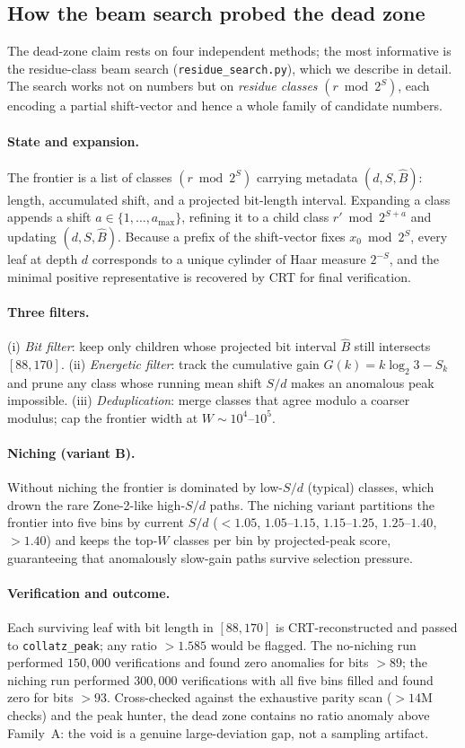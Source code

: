 \documentclass[12pt,a4paper]{article}
\theoremstyle{remark}
\begin{document}
\subsection{How the beam search probed the dead zone}
\label{subsec:beam_deadzone}
The dead-zone claim rests on four independent methods; the most informative is the residue-class beam search (\texttt{residue\_search.py}), which we describe in detail. The search works not on numbers but on \emph{residue classes} $(r\bmod 2^S)$, each encoding a partial shift-vector and hence a whole family of candidate numbers.
\paragraph{State and expansion.} The frontier is a list of classes $(r\bmod 2^S)$ carrying metadata $(d,S,\hat B)$: length, accumulated shift, and a projected bit-length interval. Expanding a class appends a shift $a\in\{1,\dots,a_{\max}\}$, refining it to a child class $r'\bmod2^{S+a}$ and updating $(d,S,\hat B)$. Because a prefix of the shift-vector fixes $x_0\bmod2^{S}$, every leaf at depth $d$ corresponds to a unique cylinder of Haar measure $2^{-S}$, and the minimal positive representative is recovered by CRT for final verification.
\paragraph{Three filters.} (i) \emph{Bit filter}: keep only children whose projected bit interval $\hat B$ still intersects $[88,170]$. (ii) \emph{Energetic filter}: track the cumulative gain $G(k)=k\log_2 3-S_k$ and prune any class whose running mean shift $S/d$ makes an anomalous peak impossible. (iii) \emph{Deduplication}: merge classes that agree modulo a coarser modulus; cap the frontier width at $W\sim10^4$--$10^5$.
\paragraph{Niching (variant B).} Without niching the frontier is dominated by low-$S/d$ (typical) classes, which drown the rare Zone-2-like high-$S/d$ paths. The niching variant partitions the frontier into five bins by current $S/d$ ($<1.05$, $1.05$--$1.15$, $1.15$--$1.25$, $1.25$--$1.40$, $>1.40$) and keeps the top-$W$ classes per bin by projected-peak score, guaranteeing that anomalously slow-gain paths survive selection pressure.
\paragraph{Verification and outcome.} Each surviving leaf with bit length in $[88,170]$ is CRT-reconstructed and passed to \texttt{collatz\_peak}; any ratio $>1.585$ would be flagged. The no-niching run performed $150{,}000$ verifications and found zero anomalies for bits $>89$; the niching run performed $300{,}000$ verifications with all five bins filled and found zero for bits $>93$. Cross-checked against the exhaustive parity scan ($>14$M checks) and the peak hunter, the dead zone contains no ratio anomaly above Family~A: the void is a genuine large-deviation gap, not a sampling artifact.
\end{document}
